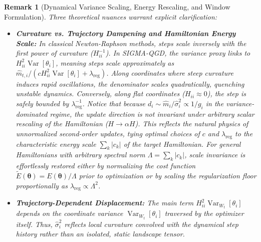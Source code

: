 \documentclass[11pt,a4paper]{article}
\newtheorem{remark}{Remark}
\begin{document}
\begin{remark}[Dynamical Variance Scaling, Energy Rescaling, and Window Formulation]
\label{rem:variance_scaling}
Three theoretical nuances warrant explicit clarification:
\begin{itemize}
    \item \textbf{Curvature vs. Trajectory Dampening and Hamiltonian Energy Scale:} In classical Newton-Raphson methods, steps scale inversely with the first power of curvature ($H_{ii}^{-1}$). In SIGMA-QGD, the variance proxy links to $H_{ii}^2 \operatorname{Var}[\theta_i]$, meaning steps scale approximately as $\hat{m}_{t,i} / (c H_{ii}^2 \operatorname{Var}[\theta_i] + \lambda_{\text{reg}})$. Along coordinates where steep curvature induces rapid oscillations, the denominator scales quadratically, quenching unstable dynamics. Conversely, along flat coordinates ($H_{ii} \approx 0$), the step is safely bounded by $\lambda_{\text{reg}}^{-1}$. Notice that because $d_i \sim \hat{m}_i / \hat{\sigma}_i^2 \propto 1/g_i$ in the variance-dominated regime, the update direction is not invariant under arbitrary scalar rescaling of the Hamiltonian ($H \to \alpha H$). This reflects the natural physics of unnormalized second-order updates, tying optimal choices of $c$ and $\lambda_{\text{reg}}$ to the characteristic energy scale $\sum_k |c_k|$ of the target Hamiltonian. For general Hamiltonians with arbitrary spectral norm $\Lambda = \sum_k |c_k|$, scale invariance is effortlessly restored either by normalizing the cost function $\tilde{E}(\boldsymbol{\theta}) = E(\boldsymbol{\theta}) / \Lambda$ prior to optimization or by scaling the regularization floor proportionally as $\lambda_{\text{reg}} \propto \Lambda^2$.
    \item \textbf{Trajectory-Dependent Displacement:} The main term $H_{ii}^2 \operatorname{Var}_{W_t}[\theta_i]$ depends on the coordinate variance $\operatorname{Var}_{W_t}[\theta_i]$ traversed by the optimizer itself. Thus, $\hat{\sigma}_i^2$ reflects local curvature convolved with the dynamical step history rather than an isolated, static landscape tensor.

\end{itemize}
\end{remark}
\end{document}

